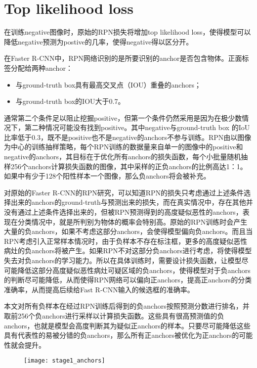 \section{Top likelihood loss}
在训练negative图像时，原始的RPN损失将增加top likelihood loss，使得模型可以降低negative预测为postive的几率，使得negative得以区分开。

在Faster R-CNN中，RPN网络识别的是所要识别的anchor是否包含物体。正面标签分配给两种anchor：
\begin{itemize}
	\item 与ground-truth box具有最高交叉点（IOU）重叠的anchors；
	\item 与ground-truth box的IOU大于0.7。
\end{itemize}

通常第二个条件足以阻止挖掘positive，但第一个条件仍然采用是因为在极少数情况下，第二种情况可能没有找到positive。其中negative与ground-truth box 的IoU比率低于0.3，既不是positive也不是negative的anchors不参与训练。RPN由以图像为中心的训练抽样策略，每个RPN训练的数据量来自单一的图像中的positive和negative的anchors，其目标在于优化所有anchors的损失函数，每个小批量随机抽样256个anchors计算损失函数的图像，其中采样的正负anchors的比例高达1：1。如果中有少于128个阳性样本一个图像，那么负anchors将会被补充。

对原始的Faster R-CNN的RPN研究，可以知道RPN的损失只考虑通过上述条件选择出来的anchors的ground-truth与预测出来的损失，而在真实情况中，存在其他并没有通过上述条件选择出来的，但被RPN预测得到的高度疑似恶性的anchors，表现在分类情况中，就是所判别为物体的概率会特别高。原始的RPN训练时会产生大量的负anchors，如果不考虑这部分anchors，会使得模型偏向负anchors。而且当RPN考虑引入正常样本情况时，由于负样本不存在标注框，更多的高度疑似恶性病灶的负anchors将被产生。如果RPN不对这部分负anchors进行考虑，将使得模型失去对负anchors的学习能力。所以在具体训练时，需要设计损失函数，让模型尽可能降低这部分高度疑似恶性病灶可疑区域的负anchors，使得模型对于负anchors的判断尽可能降低，从而使得RPN网络可以偏向正anchors，提高正anchors的分类准确率，从而提高后续给Fast R-CNN输入的候选框的准确率。

本文对所有负样本在经过RPN训练后得到的负anchors按照预测分数进行排名，并取前256个负anchors进行采样以计算损失函数。这些具有很高预测值的负anchors，也就是模型会高度判断其为疑似正anchors的样本。只要尽可能降低这些具有代表性的易被分错的负anchors，那么所有正anchors被优化为正anchors的可能性就会提升。

\begin{figure}[!htbp]
    \centering
    \texttt{[image: stage1\_anchors]}
    \label{fig:stage1_anchors}
\end{figure}

